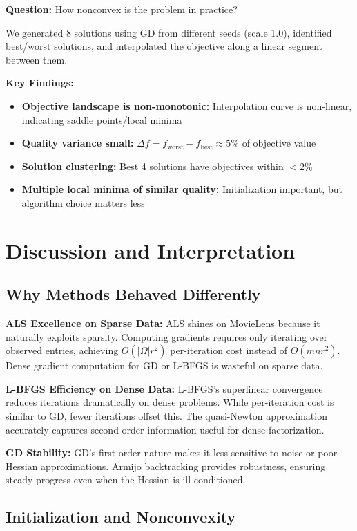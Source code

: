 \documentclass[11pt,a4paper]{article}
\begin{document}
\textbf{Question:} How nonconvex is the problem in practice?

We generated 8 solutions using GD from different seeds (scale 1.0), identified best/worst solutions, and interpolated the objective along a linear segment between them.

\textbf{Key Findings:}
\begin{itemize}
  \item \textbf{Objective landscape is non-monotonic:} Interpolation curve is non-linear, indicating saddle points/local minima
  \item \textbf{Quality variance small:} $\Delta f = f_{\text{worst}} - f_{\text{best}} \approx 5\%$ of objective value
  \item \textbf{Solution clustering:} Best 4 solutions have objectives within $< 2\%$
  \item \textbf{Multiple local minima of similar quality:} Initialization important, but algorithm choice matters less
\end{itemize}

\section{Discussion and Interpretation}

\subsection{Why Methods Behaved Differently}

\textbf{ALS Excellence on Sparse Data:} ALS shines on MovieLens because it naturally exploits sparsity. Computing gradients requires only iterating over observed entries, achieving $O(|\Omega| r^2)$ per-iteration cost instead of $O(mnr^2)$. Dense gradient computation for GD or L-BFGS is wasteful on sparse data.

\textbf{L-BFGS Efficiency on Dense Data:} L-BFGS's superlinear convergence reduces iterations dramatically on dense problems. While per-iteration cost is similar to GD, fewer iterations offset this. The quasi-Newton approximation accurately captures second-order information useful for dense factorization.

\textbf{GD Stability:} GD's first-order nature makes it less sensitive to noise or poor Hessian approximations. Armijo backtracking provides robustness, ensuring steady progress even when the Hessian is ill-conditioned.

\subsection{Initialization and Nonconvexity}
\end{document}
